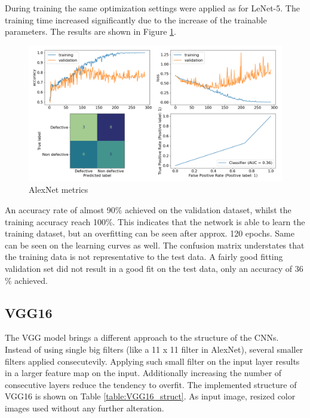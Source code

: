 \documentclass[10pt, final]{article}
\begin{document}
During training the same optimization settings were applied as for LeNet-5.
The training time increased significantly due to the increase of the trainable parameters.
The results are shown in Figure \ref{fig:AlexNet_metrics}.

\begin{figure}[!ht]
	\centering
	\includegraphics[width=\textwidth]{./tex_graphs/metrics_AlexNet.png}
	\caption{AlexNet metrics}
	\label{fig:AlexNet_metrics}
\end{figure}

An accuracy rate of almost 90\% achieved on the validation dataset, whilst the training accuracy reach 100\%.
This indicates that the network is able to learn the training dataset, but an overfitting can be seen after
approx. 120 epochs.
Same can be seen on the learning curves as well.
The confusion matrix understates that the training data is not representative to the test data.
A fairly good fitting validation set did not result in a good fit on the test data, only an accuracy of
36 \% achieved.

\subsection{VGG16} \label{sec:VGG16}
The VGG model brings a different approach to the structure of the CNNs.
Instead of using single big filters (like a 11 x 11 filter in AlexNet), several smaller filters applied
consecutevily.
Applying such small filter on the input layer results in a larger feature map on the input.
Additionally increasing the number of consecutive layers reduce the tendency to overfit.
The implemented structure of VGG16 is shown on Table \ref{table:VGG16_struct}.
As input image, resized color images used without any further alteration.
\end{document}
